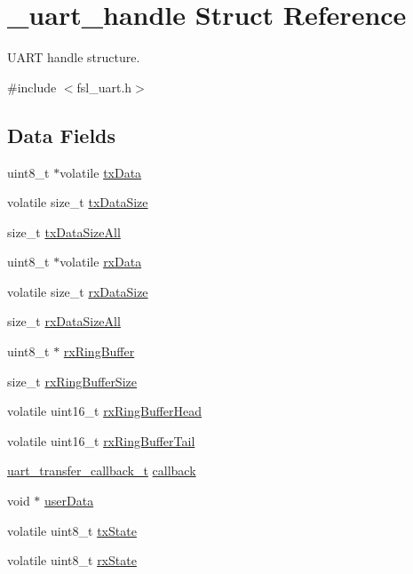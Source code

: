 \hypertarget{struct__uart__handle}{}\section{\+\_\+uart\+\_\+handle Struct Reference}
\label{struct__uart__handle}


U\+A\+RT handle structure.  




{\ttfamily \#include $<$fsl\+\_\+uart.\+h$>$}

\subsection*{Data Fields}
\begin{DoxyCompactItemize}
\item 
uint8\+\_\+t $\ast$volatile \mbox{\hyperlink{struct__uart__handle_ab56d8f300582ce9d7f4a79729124739d}{tx\+Data}}
\item 
volatile size\+\_\+t \mbox{\hyperlink{struct__uart__handle_a1f9d0ac47a5cdabb34988d5d811aceaf}{tx\+Data\+Size}}
\item 
size\+\_\+t \mbox{\hyperlink{struct__uart__handle_a733be3042be24bb3eb6f0c6a82d28862}{tx\+Data\+Size\+All}}
\item 
uint8\+\_\+t $\ast$volatile \mbox{\hyperlink{struct__uart__handle_aa58335de5bfa8923228432b62ea9308a}{rx\+Data}}
\item 
volatile size\+\_\+t \mbox{\hyperlink{struct__uart__handle_ae1b7c6ae1b7e7ead628afe5410fa3f31}{rx\+Data\+Size}}
\item 
size\+\_\+t \mbox{\hyperlink{struct__uart__handle_a180fd12c1a88bb61ac4b817f4e4e6bcd}{rx\+Data\+Size\+All}}
\item 
uint8\+\_\+t $\ast$ \mbox{\hyperlink{struct__uart__handle_a522d206ac2b0dde63cd3e7190853eaf2}{rx\+Ring\+Buffer}}
\item 
size\+\_\+t \mbox{\hyperlink{struct__uart__handle_a3fc25566538e662d74eb1444598a8277}{rx\+Ring\+Buffer\+Size}}
\item 
volatile uint16\+\_\+t \mbox{\hyperlink{struct__uart__handle_ac4f75206cf9b8009cdf64a30e05b01d8}{rx\+Ring\+Buffer\+Head}}
\item 
volatile uint16\+\_\+t \mbox{\hyperlink{struct__uart__handle_a89b3f14260503bd82300f27872236474}{rx\+Ring\+Buffer\+Tail}}
\item 
\mbox{\hyperlink{group__uart__driver_ga2868b6ea396ab212547f2157380429c5}{uart\+\_\+transfer\+\_\+callback\+\_\+t}} \mbox{\hyperlink{struct__uart__handle_aa499a13beb1e3ebd00438325f5107a65}{callback}}
\item 
void $\ast$ \mbox{\hyperlink{struct__uart__handle_a2e294dd14122c554baa0665072b4ca7a}{user\+Data}}
\item 
volatile uint8\+\_\+t \mbox{\hyperlink{struct__uart__handle_a4e027f3342bad321ec60b56d164eb068}{tx\+State}}
\item 
volatile uint8\+\_\+t \mbox{\hyperlink{struct__uart__handle_a6f289c8f3bd5e967fb808de6da7f1c0c}{rx\+State}}
\end{DoxyCompactItemize}


